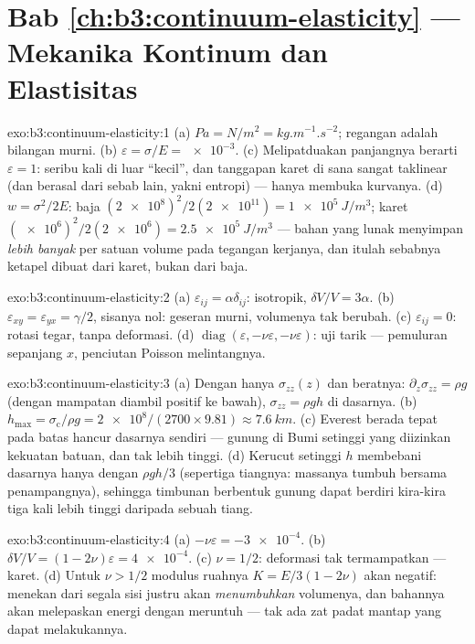 \section*{Bab \ref{ch:b3:continuum-elasticity} --- Mekanika Kontinum dan Elastisitas}

\begin{solution}{exo:b3:continuum-elasticity:1}
(a) $\unit{Pa} = \unit{N/m^2} = \unit{kg.m^{-1}.s^{-2}}$; regangan
adalah bilangan murni. (b) $\varepsilon = \sigma/E = \num{e-3}$. (c)
Melipatduakan panjangnya berarti $\varepsilon = 1$: seribu kali di luar
``kecil'', dan tanggapan karet di sana sangat taklinear (dan berasal
dari sebab lain, yakni entropi) ---  hanya membuka kurvanya.
(d) $w =
\sigma^2/2E$: baja $(\num{2e8})^2/2(\num{2e11}) =
\qty{1e5}{J/m^3}$; karet $(\num{e6})^2/2(\num{2e6}) =
\qty{2.5e5}{J/m^3}$ --- bahan yang lunak menyimpan \emph{lebih banyak}
per satuan volume pada tegangan kerjanya, dan itulah sebabnya ketapel
dibuat dari karet, bukan dari baja.
\end{solution}

\begin{solution}{exo:b3:continuum-elasticity:2}
(a) $\varepsilon_{ij} = \alpha\delta_{ij}$:  isotropik,
$\delta V/V = 3\alpha$. (b) $\varepsilon_{xy} = \varepsilon_{yx} =
\gamma/2$, sisanya nol: geseran murni, volumenya tak berubah. (c)
$\varepsilon_{ij} = 0$: rotasi tegar, tanpa deformasi. (d)
$\operatorname{diag}(\varepsilon, -\nu\varepsilon, -\nu\varepsilon)$:
uji tarik --- pemuluran sepanjang $x$, penciutan Poisson melintangnya.
\end{solution}

\begin{solution}{exo:b3:continuum-elasticity:3}
(a) Dengan hanya $\sigma_{zz}(z)$ dan beratnya: $\partial_z\sigma_{zz} =
\rho g$ (dengan mampatan diambil positif ke bawah), $\sigma_{zz} = \rho
gh$ di dasarnya. (b) $h_{\max} = \sigma_{\text{c}}/\rho g =
\num{2e8}/(2700 \times 9.81) \approx \qty{7.6}{km}$. (c) Everest berada
tepat pada batas hancur dasarnya sendiri --- gunung di Bumi setinggi
yang diizinkan kekuatan batuan, dan tak lebih tinggi. (d) Kerucut
setinggi $h$ membebani dasarnya hanya dengan $\rho gh/3$ (sepertiga
tiangnya: massanya tumbuh bersama penampangnya), sehingga timbunan
berbentuk gunung dapat berdiri kira-kira tiga kali lebih tinggi
daripada sebuah tiang.
\end{solution}

\begin{solution}{exo:b3:continuum-elasticity:4}
(a) $-\nu\varepsilon = \num{-3e-4}$. (b) $\delta V/V = (1 -
2\nu)\varepsilon = \num{4e-4}$. (c) $\nu = 1/2$: deformasi tak
termampatkan --- karet. (d) Untuk $\nu > 1/2$ modulus ruahnya $K =
E/3(1 - 2\nu)$ akan negatif: menekan dari segala sisi justru akan
\emph{menumbuhkan} volumenya, dan bahannya akan melepaskan energi dengan
meruntuh --- tak ada zat padat mantap yang dapat melakukannya.
\end{solution}

